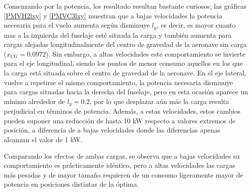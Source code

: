 Comenzando por la potencia, los resultado resultan bastante curiosos; las gráficas \ref{PMVH2lxy} y \ref{PMVC3lxy} muestran que a bajas velocidades la potencia necesaria para el vuelo aumenta según disminuye $l_y$, es decir, es mayor cuanto mas a la izquierda del fuselaje esté situada la carga y también aumenta para cargas alejadas longitudinalmente del centro de gravedad de la aeronave sin carga ($x_{CG}=0.0972$). Sin embargo, a altas velocidades este comportamiento se invierte para el eje longitudinal, siendo los puntos de menor consumo aquellos en los que la carga está situada sobre el centro de gravedad de la aeronave. En el eje lateral, vuelve a repetirse el mismo comportamiento, la potencia necesaria disminuye para cargas situadas hacia la derecha del fuselaje, pero en esta ocasión aparece un mínimo alrededor de $l_y=0.2$, por lo que desplazar aún más la carga resulta perjudicial en términos de potencia. Además, a estas velocidades, estos cambios pueden suponer una reducción de hasta 10 kW respecto a valores extremos de posición, a diferencia de a bajas velocidades donde las diferencias apenas alcanzan el valor de 1 kW.

Comparando los efectos de ambas cargas, se observa que a bajas velocidades su comportamiento es prácticamente idéntico, pero a altas velocidades las cargas más pesadas y de mayor tamaño requieren de un consumo ligeramente mayor de potencia en posiciones distintas de la óptima.

